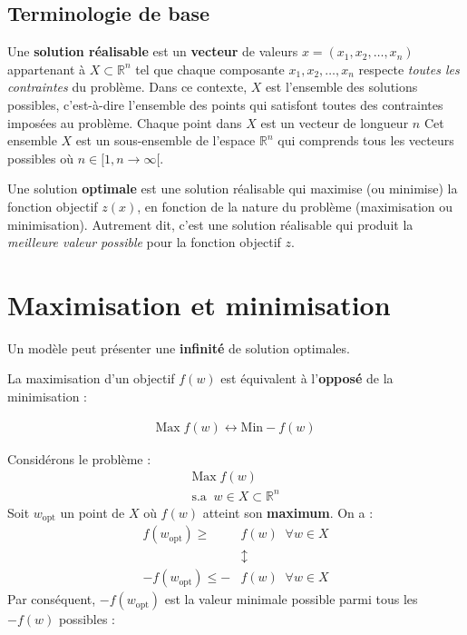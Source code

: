 \documentclass{report}
\begin{document}
\begin{multicols*}{3}
\section{Terminologie de base}
 Une \textbf{solution réalisable} est un \textbf{vecteur} 
 de valeurs $x = (x_1, x_2, \dots, x_n)$ appartenant à $X \subset \mathbb{R}^n$ tel 
 que chaque composante $x_1, x_2, \dots, x_n$ respecte \textit{toutes les contraintes} du problème.
 Dans ce contexte, $X$ est l'ensemble des solutions possibles, c'est-à-dire l'ensemble des points qui satisfont toutes des contraintes imposées au problème.
 Chaque point dans $X$ est un vecteur de longueur $n$ 
 Cet ensemble $X$ est un sous-ensemble de l'espace $\mathbb{R}^n$ 
 qui comprends tous les vecteurs possibles où 
 $n \in [1, n \longrightarrow \infty[$.

Une solution \textbf{optimale} est une solution réalisable qui maximise (ou minimise) la fonction objectif $z(x)$, en fonction de la nature du problème (maximisation ou minimisation). Autrement dit, c'est une solution réalisable qui produit la \textit{meilleure valeur possible} pour la fonction objectif $z$.

\vspace{2.5em}
\chapter{Maximisation et minimisation}

\begin{note}{}{}
    Un modèle peut présenter une \textbf{infinité} de 
    solution optimales. 
\end{note}       

\begin{theorem}{}{}
    La maximisation d'un objectif $f(w)$ est équivalent à l'\textbf{opposé}
    de la minimisation :

    \begin{align*}
        \text{Max} \; f(w) \leftrightarrow  \text{Min} -f(w)
    \end{align*}
\end{theorem}

\begin{Preuve}{}{}
    Considérons le problème :
    \begin{align*}
        \text{Max} \; f(w) \\ 
        \text{s.a} \;\; w \in X \subset \mathbb{R}^n
    \end{align*}
    Soit $w_{\text{opt}}$ un point de $X$ où $f(w)$ atteint son  
    \textbf{\textcolor{myb}{maximum}}. On a :  
    \begin{align*}
        f\left(w_{\text{opt}} \right) \geq &f(w) \;\; \forall w \in X \\
                                           &\updownarrow \\ 
        - f\left(w_{\text{opt}} \right) \leq - &f(w) \;\; \forall w \in X 
    \end{align*}
    Par conséquent, $-f(w_{\text{opt}})$ est la valeur minimale possible parmi 
    tous les $-f(w)$ possibles :


\end{Preuve}
\end{multicols*}
\end{document}
